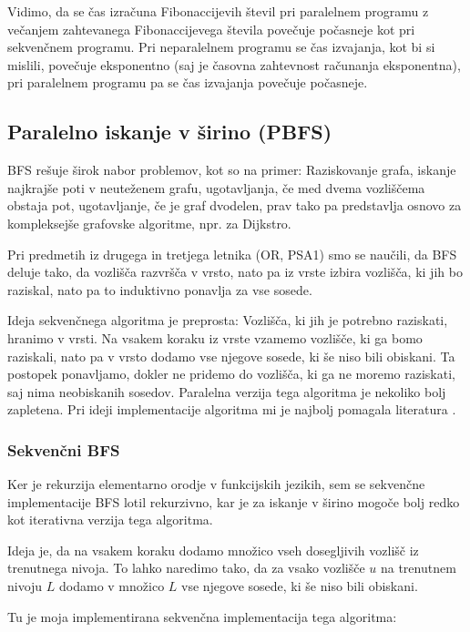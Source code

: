\documentclass[mat1, tisk]{fmfdelo}
\begin{document}
Vidimo, da se čas izračuna Fibonaccijevih števil pri paralelnem programu z večanjem zahtevanega Fibonaccijevega števila
povečuje počasneje kot pri sekvenčnem programu. Pri neparalelnem programu se čas izvajanja, kot bi
si mislili, povečuje eksponentno (saj je časovna zahtevnost računanja eksponentna), pri paralelnem programu pa se čas
izvajanja povečuje počasneje.

\subsection{Paralelno iskanje v širino (PBFS)}

BFS rešuje širok nabor problemov, kot so na primer: Raziskovanje grafa, iskanje najkrajše poti v neuteženem grafu, 
ugotavljanja, če med dvema vozliščema obstaja pot, ugotavljanje, če je graf dvodelen, prav tako pa predstavlja osnovo
za kompleksejše grafovske algoritme, npr. za Dijkstro.

Pri predmetih iz drugega in tretjega letnika (OR, PSA1) smo se naučili, da BFS deluje tako, da vozlišča razvršča
v vrsto, nato pa iz vrste izbira vozlišča, ki jih bo raziskal, nato pa to induktivno ponavlja za vse sosede.

Ideja sekvenčnega algoritma je preprosta: Vozlišča, ki jih je potrebno raziskati, hranimo v vrsti. Na vsakem koraku
iz vrste vzamemo vozlišče, ki ga bomo raziskali, nato pa v vrsto dodamo vse njegove sosede, ki še niso bili obiskani.
Ta postopek ponavljamo, dokler ne pridemo do vozlišča, ki ga ne moremo raziskati, saj nima neobiskanih sosedov.
Paralelna verzija tega algoritma je nekoliko bolj zapletena. Pri ideji implementacije algoritma mi je najbolj pomagala
literatura \cite{spaa2010}.

\subsubsection{Sekvenčni BFS}

Ker je rekurzija elementarno orodje v funkcijskih jezikih, sem se sekvenčne implementacije BFS lotil rekurzivno, kar
je za iskanje v širino mogoče bolj redko kot iterativna verzija tega algoritma. 

Ideja je, da na vsakem koraku dodamo množico vseh dosegljivih vozlišč iz trenutnega nivoja. To lahko naredimo tako, da
za vsako vozlišče $u$ na trenutnem nivoju $L$ dodamo v množico $L$ vse njegove sosede, ki še niso bili obiskani.

Tu je moja implementirana sekvenčna implementacija tega algoritma:
\end{document}
